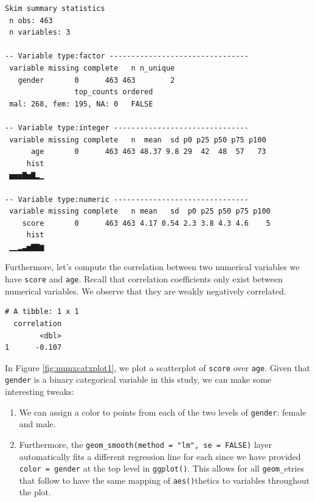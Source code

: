 \documentclass[12pt,]{krantz}
\makeatletter
\newenvironment{Shaded}{\begin{snugshade}}{\end{snugshade}}
\newcommand{\KeywordTok}[1]{\textcolor[rgb]{0.27,0.27,0.27}{\textbf{#1}}}
\newcommand{\DataTypeTok}[1]{\textcolor[rgb]{0.27,0.27,0.27}{#1}}
\newcommand{\StringTok}[1]{\textcolor[rgb]{0.5,0.5,0.5}{#1}}
\newcommand{\OperatorTok}[1]{\textcolor[rgb]{0.43,0.43,0.43}{\textbf{#1}}}
\newcommand{\NormalTok}[1]{#1}
\providecommand{\tightlist}{%
  \setlength{\itemsep}{0pt}\setlength{\parskip}{0pt}}
\newenvironment{kframe}{%
\medskip{}
\setlength{\fboxsep}{.8em}
 \def\at@end@of@kframe{}%
 \ifinner\ifhmode%
  \def\at@end@of@kframe{\end{minipage}}%
  \begin{minipage}{\columnwidth}%
 \fi\fi%
 \def\FrameCommand##1{\hskip\@totalleftmargin \hskip-\fboxsep
 \colorbox{shadecolor}{##1}\hskip-\fboxsep
     \hskip-\linewidth \hskip-\@totalleftmargin \hskip\columnwidth}%
 \MakeFramed {\advance\hsize-\width
   \@totalleftmargin\z@ \linewidth\hsize
   \@setminipage}}%
 {\par\unskip\endMakeFramed%
 \at@end@of@kframe}
\renewenvironment{Shaded}{\begin{kframe}}{\end{kframe}}
\theoremstyle{definition}
\theoremstyle{definition}
\theoremstyle{definition}
\theoremstyle{remark}
\makeatother
\begin{document}
\begin{verbatim}
Skim summary statistics
 n obs: 463 
 n variables: 3 

-- Variable type:factor --------------------------------
 variable missing complete   n n_unique
   gender       0      463 463        2
                top_counts ordered
 mal: 268, fem: 195, NA: 0   FALSE

-- Variable type:integer -------------------------------
 variable missing complete   n  mean  sd p0 p25 p50 p75 p100
      age       0      463 463 48.37 9.8 29  42  48  57   73
     hist
 ▅▅▅▇▅▇▂▁

-- Variable type:numeric -------------------------------
 variable missing complete   n mean   sd  p0 p25 p50 p75 p100
    score       0      463 463 4.17 0.54 2.3 3.8 4.3 4.6    5
     hist
 ▁▁▂▃▅▇▇▆
\end{verbatim}

Furthermore, let's compute the correlation between two numerical
variables we have \texttt{score} and \texttt{age}. Recall that
correlation coefficients only exist between numerical variables. We
observe that they are weakly negatively correlated.

\begin{Shaded}
\end{Shaded}

\begin{verbatim}
# A tibble: 1 x 1
  correlation
        <dbl>
1      -0.107
\end{verbatim}

In Figure \ref{fig:numxcatxplot1}, we plot a scatterplot of
\texttt{score} over \texttt{age}. Given that \texttt{gender} is a binary
categorical variable in this study, we can make some interesting tweaks:

\begin{enumerate}
\def\labelenumi{\arabic{enumi}.}
\tightlist
\item
  We can assign a color to points from each of the two levels of
  \texttt{gender}: female and male.
\item
  Furthermore, the \texttt{geom\_smooth(method\ =\ "lm",\ se\ =\ FALSE)}
  layer automatically fits a different regression line for each since we
  have provided \texttt{color\ =\ gender} at the top level in
  \texttt{ggplot()}. This allows for all \texttt{geom\_}etries that
  follow to have the same mapping of \texttt{aes()}thetics to variables
  throughout the plot.
\end{enumerate}
\end{document}
